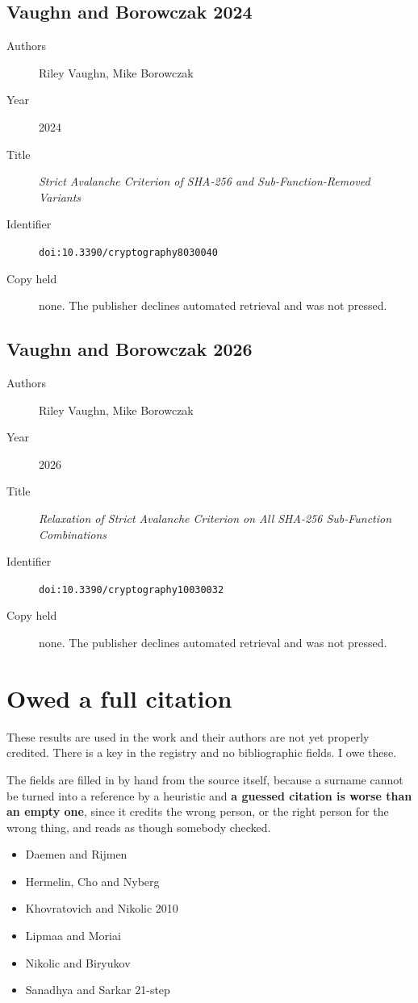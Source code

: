 \subsection*{Vaughn and Borowczak 2024}
\begin{description}
\item[Authors] Riley Vaughn, Mike Borowczak
\item[Year] 2024
\item[Title] \emph{Strict Avalanche Criterion of SHA-256 and Sub-Function-Removed Variants}
\item[Identifier] \texttt{doi:10.3390/cryptography8030040}
\item[Copy held] none. The publisher declines automated retrieval and was not pressed.
\end{description}

\subsection*{Vaughn and Borowczak 2026}
\begin{description}
\item[Authors] Riley Vaughn, Mike Borowczak
\item[Year] 2026
\item[Title] \emph{Relaxation of Strict Avalanche Criterion on All SHA-256 Sub-Function Combinations}
\item[Identifier] \texttt{doi:10.3390/cryptography10030032}
\item[Copy held] none. The publisher declines automated retrieval and was not pressed.
\end{description}

\section{Owed a full citation}

These results are used in the work and their authors are not yet properly
credited. There is a key in the registry and no bibliographic fields. I owe these.

The fields are filled in by hand from the source itself, because a surname cannot
be turned into a reference by a heuristic and \textbf{a guessed citation is worse
than an empty one}, since it credits the wrong person, or the right person for the
wrong thing, and reads as though somebody checked.

\begin{itemize}
\item Daemen and Rijmen
\item Hermelin, Cho and Nyberg
\item Khovratovich and Nikolic 2010
\item Lipmaa and Moriai
\item Nikolic and Biryukov
\item Sanadhya and Sarkar 21-step
\end{itemize}

